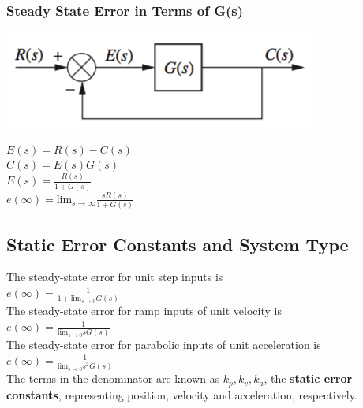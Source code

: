 \documentclass[11pt]{article}
\begin{document}
    \subsubsection{Steady State Error in Terms of G(s)}

    \begin{center}
        \includegraphics[width=300 px]{img/unityfeedback} \\
    \end{center}

    \begin{center}
        $E(s) = R(s) - C(s)$ \\
        $C(s) = E(s)G(s)$ \\ 
        $E(s) = \frac{R(s)}{1 + G(s)}$ \\
        $e(\infty) = \text{lim}_{s\rightarrow \infty} \frac{sR(s)}{1 + G(s)} $ \\ 
    \end{center}

    \subsection{Static Error Constants and System Type}

    The steady-state error for unit step inputs is \\ 

    $e(\infty) = \frac{1}{1 + \text{lim}_{s\rightarrow 0} G(s)}$ \\
    
    The steady-state error for ramp inputs of unit velocity is \\
    
    $e(\infty) = \frac{1}{\text{lim}_{s\rightarrow 0} sG(s)}$ \\

    The steady-state error for parabolic inputs of unit acceleration is \\
    
    $e(\infty) = \frac{1}{\text{lim}_{s\rightarrow 0} s^2G(s)}$ \\

    The terms in the denominator are known as $k_p, k_v, k_a$, the \textbf{static error constants}, representing position, velocity and acceleration, respectively. \\
    
\end{document}
